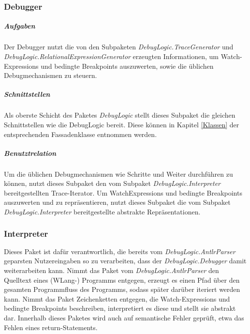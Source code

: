 \documentclass[parskip=full]{scrartcl}
\begin{document}
\subsubsection{Debugger}
\subparagraph{Aufgaben}
Der Debugger nutzt die von den Subpaketen \textit{DebugLogic.TraceGenerator} und \textit{DebugLogic.RelationalExpressionGenerator} erzeugten Informationen, um Watch-Expressions und bedingte Breakpoints auszuwerten, sowie die üblichen Debugmechanismen zu steuern.
\subparagraph{Schnittstellen}
Als oberste Schicht des Paketes \textit{DebugLogic} stellt dieses Subpaket die gleichen Schnittstellen wie die DebugLogic bereit. Diese können in Kapitel \ref{Klassen} der entsprechenden Fassadenklasse entnommen werden.
\subparagraph{Benutztrelation} 


Um die üblichen Debugmechanismen wie Schritte und Weiter durchführen zu können, nutzt dieses Subpaket den vom Subpaket \textit{DebugLogic.Interpreter} bereitgestellten Trace-Iterator. 
Um WatchExpressions und bedingte Breakpoints auszuwerten und zu repräsentieren, nutzt dieses Subpaket die vom Subpaket \textit{DebugLogic.Interpreter} bereitgestellte abstrakte Repräsentationen.

\subsubsection{Interpreter}
Dieses Paket ist dafür verantwortlich, die bereits vom \textit{DebugLogic.AntlrParser}  geparsten Nutzereingaben so zu verarbeiten, dass der \textit{DebugLogic.Debugger} damit weiterarbeiten kann. Nimmt das Paket vom \textit{DebugLogic.AntlrParser} den Quelltext eines (WLang-) Programms entgegen, erzeugt es einen Pfad über den gesamten Programmfluss des Programms, sodass später darüber iteriert werden kann. Nimmt das Paket Zeichenketten entgegen, die Watch-Expressions und bedingte Breakpoints beschreiben, interpretiert es diese und stellt sie abstrakt dar.
Innerhalb dieses Paketes wird auch auf semantische Fehler geprüft, etwa das Fehlen eines return-Statements.
\end{document}
